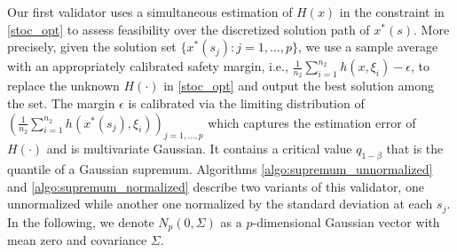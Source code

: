 \documentclass[mnsc,blindrev]{informs4} %
\begin{document}
Our first validator uses a simultaneous estimation of $H(x)$ in the constraint in \eqref{stoc_opt} to assess feasibility over the discretized solution path of $x^*(s)$. More precisely, given the solution set $\{x^*(s_j):j=1,\ldots,p\}$, we use a sample average with an appropriately calibrated safety margin, i.e., $\frac{1}{n_2}\sum_{i=1}^{n_2}h(x,\xi_i)-\epsilon$, to replace the unknown $H(\cdot)$ in \eqref{stoc_opt} and output the best solution among the set. The margin $\epsilon$ is calibrated via the limiting distribution of $(\frac{1}{n_2}\sum_{i=1}^{n_2}h(x^*(s_j),\xi_i))_{j=1,\ldots,p}$ which captures the estimation error of $H(\cdot)$ and is multivariate Gaussian. It contains a critical value $q_{1-\beta}$ that is the quantile of a Gaussian supremum. Algorithms \ref{algo:supremum_unnormalized} and \ref{algo:supremum_normalized} describe two variants of this validator, one unnormalized while another one normalized by the standard deviation at each $s_j$. In the following, we denote $N_p(0,\Sigma)$ as a $p$-dimensional Gaussian vector with mean zero and covariance $\Sigma$.
\end{document}
